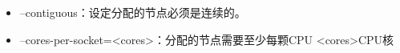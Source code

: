 \begin{itemize}
     \item --contiguous：设定分配的节点必须是连续的。
     \item --cores-per-socket=<cores>：分配的节点需要至少每颗CPU <cores>CPU核







\end{itemize}
